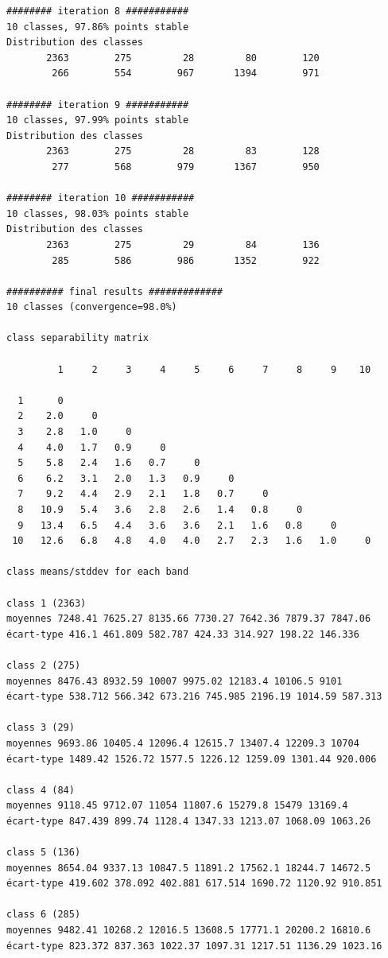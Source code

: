\documentclass[earth,article,accept,pdftex,moreauthors]{Definitions/mdpi}
\begin{document}
{\begin{scriptsize}
\begin{verbatim}
######## iteration 8 ###########
10 classes, 97.86% points stable
Distribution des classes
       2363        275         28         80        120
        266        554        967       1394        971

######## iteration 9 ###########
10 classes, 97.99% points stable
Distribution des classes
       2363        275         28         83        128
        277        568        979       1367        950

######## iteration 10 ###########
10 classes, 98.03% points stable
Distribution des classes
       2363        275         29         84        136
        285        586        986       1352        922

########## final results #############
10 classes (convergence=98.0%)

class separability matrix

         1     2     3     4     5     6     7     8     9    10

  1      0
  2    2.0     0
  3    2.8   1.0     0
  4    4.0   1.7   0.9     0
  5    5.8   2.4   1.6   0.7     0
  6    6.2   3.1   2.0   1.3   0.9     0
  7    9.2   4.4   2.9   2.1   1.8   0.7     0
  8   10.9   5.4   3.6   2.8   2.6   1.4   0.8     0
  9   13.4   6.5   4.4   3.6   3.6   2.1   1.6   0.8     0
 10   12.6   6.8   4.8   4.0   4.0   2.7   2.3   1.6   1.0     0

class means/stddev for each band

class 1 (2363)
moyennes 7248.41 7625.27 8135.66 7730.27 7642.36 7879.37 7847.06
écart-type 416.1 461.809 582.787 424.33 314.927 198.22 146.336

class 2 (275)
moyennes 8476.43 8932.59 10007 9975.02 12183.4 10106.5 9101
écart-type 538.712 566.342 673.216 745.985 2196.19 1014.59 587.313

class 3 (29)
moyennes 9693.86 10405.4 12096.4 12615.7 13407.4 12209.3 10704
écart-type 1489.42 1526.72 1577.5 1226.12 1259.09 1301.44 920.006

class 4 (84)
moyennes 9118.45 9712.07 11054 11807.6 15279.8 15479 13169.4
écart-type 847.439 899.74 1128.4 1347.33 1213.07 1068.09 1063.26

class 5 (136)
moyennes 8654.04 9337.13 10847.5 11891.2 17562.1 18244.7 14672.5
écart-type 419.602 378.092 402.881 617.514 1690.72 1120.92 910.851

class 6 (285)
moyennes 9482.41 10268.2 12016.5 13608.5 17771.1 20200.2 16810.6
écart-type 823.372 837.363 1022.37 1097.31 1217.51 1136.29 1023.16


\end{verbatim}
\end{scriptsize}}
\end{document}
